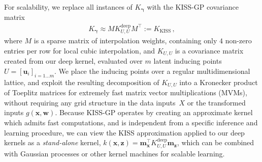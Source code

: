 \documentclass[twoside,11pt]{article}
\newcommand{\mbf}[1]{{\boldsymbol{\mathbf{#1}}}}
\renewcommand{\bm}{\mbf}
\begin{document}
For scalability, we replace all instances of $K_{\bm{\gamma}}$ with the KISS-GP
covariance matrix \citep{wilsonnickisch2015, wdn2015}
\begin{align}
K_{\bm{\gamma}} \approx M K^{\text{deep}}_{U,U} M^{\top} := K_{\text{KISS}} \,,
\end{align}
where $M$ is a sparse matrix of interpolation weights, containing only
$4$ non-zero entries per row for local cubic interpolation, and $K_{U,U}$
is a covariance matrix created from our deep kernel, evaluated over $m$ latent inducing
points $U = [\mathbf{u}_i]_{i=1 \dots m}$.
We place the inducing points over a regular multidimensional lattice, and
exploit the resulting decomposition of $K_{U,U}$ into a Kronecker product of
Toeplitz matrices for extremely fast matrix vector multiplications (MVMs), without requiring
any grid structure in the data inputs~$X$ or the transformed inputs $g(\bm{x},\bm{w})$.
Because KISS-GP operates by creating an approximate kernel which admits
fast computations, and is independent from a specific inference and learning procedure,
we can view the KISS approximation applied to our deep kernels as a \emph{stand-alone}
kernel, $k(\bm{x},\bm{z}) = \bm{m}_\bm{x}^{\top} K^{\text{deep}}_{U,U} \bm{m}_\bm{z}$, which can be combined with Gaussian processes or other kernel machines for
scalable learning.


\end{document}
